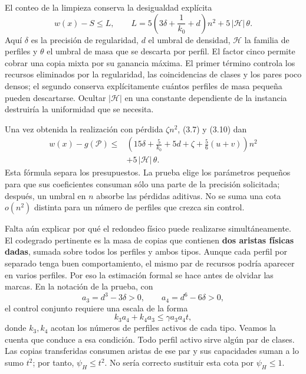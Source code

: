 \documentclass[spanish,11pt,a4paper]{article}
\begin{document}
El conteo de la limpieza conserva la desigualdad explícita \[
w(x)-S\le L,\qquad
L=5\left(3\delta+\frac1{k_0}+d\right)n^2
  +5\,|\mathcal H|\,\theta.
\tag{3.10}
\] Aquí \(\delta\) es la precisión de regularidad, \(d\) el umbral de densidad, \(\mathcal H\) la familia de perfiles y \(\theta\) el umbral de masa que se descarta por perfil. El factor cinco permite cobrar una copia mixta por su ganancia máxima. El primer término controla los recursos eliminados por la regularidad, las coincidencias de clases y los pares poco densos; el segundo conserva explícitamente cuántos perfiles de masa pequeña pueden descartarse. Ocultar \(|\mathcal H|\) en una constante dependiente de la instancia destruiría la uniformidad que se necesita.

Una vez obtenida la realización con pérdida \(\zeta n^2\), (3.7) y (3.10) dan \[
\begin{aligned}
w(x)-g(\mathcal P)\le{}&
\left(15\delta+\frac5{k_0}+5d+\zeta
             +\frac56(u+v)\right)n^2\\
&+5\,|\mathcal H|\,\theta .
\end{aligned}
\tag{3.11}
\] Esta fórmula separa los presupuestos. La prueba elige los parámetros pequeños para que sus coeficientes consuman sólo una parte de la precisión solicitada; después, un umbral en \(n\) absorbe las pérdidas aditivas. No se suma una cota \(o(n^2)\) distinta para un número de perfiles que crezca sin control.

Falta aún explicar por qué el redondeo físico puede realizarse simultáneamente. El codegrado pertinente es la masa de copias que contienen \textbf{dos aristas físicas dadas}, sumada sobre todos los perfiles y ambos tipos. Aunque cada perfil por separado tenga buen comportamiento, el mismo par de recursos podría aparecer en varios perfiles. Por eso la estimación formal se hace antes de olvidar las marcas. En la notación de la prueba, con \[
a_3=d^3-3\delta>0,\qquad a_4=d^6-6\delta>0,
\] el control conjunto requiere una escala de la forma \[
k_3a_4+k_4a_3\le\gamma a_3a_4t,
\tag{3.12}
\] donde \(k_3,k_4\) acotan los números de perfiles activos de cada tipo. Veamos la cuenta que conduce a esa condición. Todo perfil activo sirve algún par de clases. Las copias transferidas consumen aristas de ese par y sus capacidades suman a lo sumo \(t^2\); por tanto, \(\psi_H\le t^2\). No sería correcto sustituir esta cota por \(\psi_H\le1\).
\end{document}
